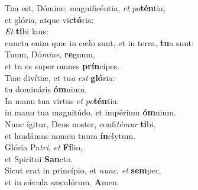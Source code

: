 \evenverse Tua est, Dómine, magnificéntia, \textit{et} \textit{po}\textbf{tén}tia,~\*\\
\evenverse et glória, atque vi\textbf{ctó}ria:\\
\oddverse \textit{Et} \textbf{ti}bi laus:~\*\\
\oddverse cuncta enim quæ in cælo sunt, et in terra, \textbf{tu}a sunt:\\
\evenverse Tuum, Dó\textit{mi}\textit{ne}, \textbf{re}gnum,~\*\\
\evenverse et tu es super omnes \textbf{prín}cipes.\\
\oddverse Tuæ divítiæ, et tu\textit{a} \textit{est} \textbf{gló}ria:~\*\\
\oddverse tu domináris \textbf{óm}nium,\\
\evenverse In manu tua virtus \textit{et} \textit{po}\textbf{tén}tia:~\*\\
\evenverse in manu tua magnitúdo, et impérium \textbf{óm}nium.\\
\oddverse Nunc ígitur, Deus noster, confi\textit{té}\textit{mur} \textbf{ti}bi,~\*\\
\oddverse et laudámus nomen tuum \textbf{ín}clytum.\\
\evenverse Glória Pa\textit{tri}, \textit{et} \textbf{Fí}lio,~\*\\
\evenverse et Spirítui \textbf{San}cto.\\
\oddverse Sicut erat in princípio, et \textit{nunc}, \textit{et} \textbf{sem}per,~\*\\
\oddverse et in sǽcula sæculórum. \textbf{A}men.\\
